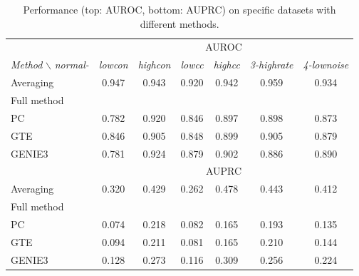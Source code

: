 \documentclass[wcp]{jmlr}
\begin{document}
\begin{table}[h]
\caption{Performance (top: AUROC, bottom: AUPRC) on specific datasets with different methods.}
\label{tab:results_appendix}
\centering
\small
\begin{tabular}{| l | c c c c c c |}
\hline
& \multicolumn{6}{c|}{AUROC}\\
\textit{Method} $\backslash$ \textit{normal-} & \textit{lowcon} & \textit{highcon} & \textit{lowcc} & \textit{highcc} & \textit{3-highrate} & \textit{4-lownoise} \\
\hline
\hline
Averaging     & 0.947 & 0.943 & 0.920 & 0.942 & 0.959 & 0.934 \\
Full method   &  &  &  & & &\\
PC & 0.782 & 0.920 &  0.846 & 0.897  & 0.898  & 0.873 \\
GTE & 0.846 & 0.905 & 0.848 & 0.899 & 0.905 & 0.879\\
GENIE3 & 0.781 &  0.924 & 0.879 & 0.902 & 0.886 &  0.890 \\ \hline \hline
& \multicolumn{6}{c|}{AUPRC}\\ \hline
Averaging     & 0.320 & 0.429 & 0.262 & 0.478 & 0.443 & 0.412 \\
Full method   &  &  &  & & &\\
PC & 0.074 & 0.218 & 0.082 & 0.165  & 0.193 & 0.135 \\
GTE & 0.094 & 0.211 & 0.081 & 0.165 & 0.210 & 0.144\\
GENIE3 & 0.128 & 0.273 & 0.116 & 0.309 & 0.256 & 0.224\\ \hline
\end{tabular}
\end{table}
\end{document}
